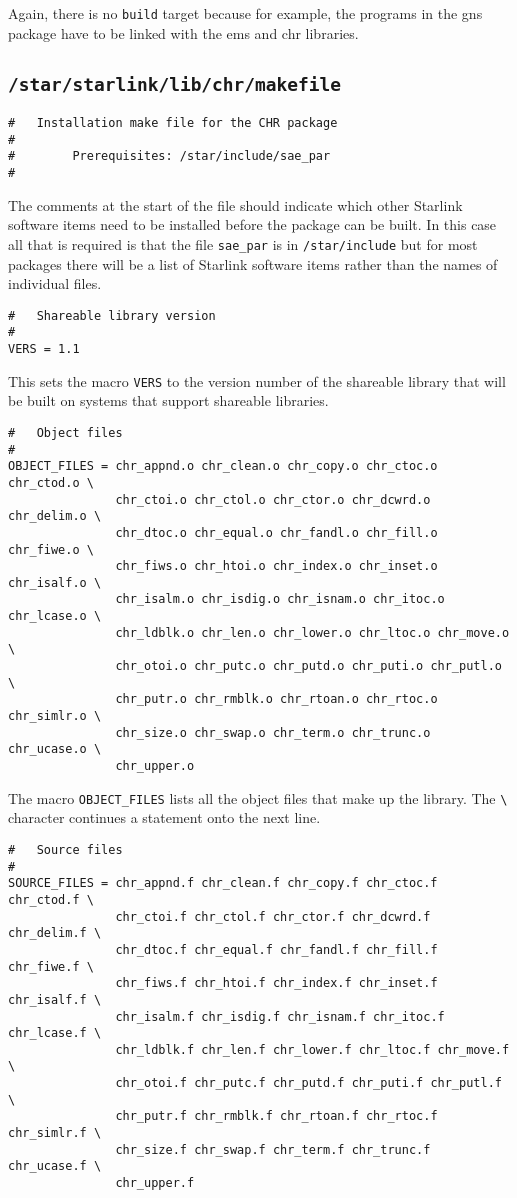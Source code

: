 Again, there is no {\tt build} target because for example, the programs in 
the gns package have to be linked with the ems and chr libraries.
\subsection{\tt /star/starlink/lib/chr/makefile}
\begin{verbatim}
#   Installation make file for the CHR package
#
#        Prerequisites: /star/include/sae_par
#
\end{verbatim}
The comments at the start of the file
should indicate which other Starlink software items need to be installed before
the package can be built. In this case all that is required is that the file
{\tt sae\_par} is in {\tt /star/include} but for most packages there will be a
list of Starlink software items rather than the names of individual files.
\begin{verbatim}
#   Shareable library version
#
VERS = 1.1
\end{verbatim}
This sets the macro {\tt VERS} to the version number of the shareable
library that will be built on systems that support shareable libraries.
\begin{verbatim}
#   Object files 
#
OBJECT_FILES = chr_appnd.o chr_clean.o chr_copy.o chr_ctoc.o chr_ctod.o \
               chr_ctoi.o chr_ctol.o chr_ctor.o chr_dcwrd.o chr_delim.o \
               chr_dtoc.o chr_equal.o chr_fandl.o chr_fill.o chr_fiwe.o \
               chr_fiws.o chr_htoi.o chr_index.o chr_inset.o chr_isalf.o \
               chr_isalm.o chr_isdig.o chr_isnam.o chr_itoc.o chr_lcase.o \
               chr_ldblk.o chr_len.o chr_lower.o chr_ltoc.o chr_move.o \
               chr_otoi.o chr_putc.o chr_putd.o chr_puti.o chr_putl.o \
               chr_putr.o chr_rmblk.o chr_rtoan.o chr_rtoc.o chr_simlr.o \
               chr_size.o chr_swap.o chr_term.o chr_trunc.o chr_ucase.o \
               chr_upper.o
\end{verbatim}
The macro {\tt OBJECT\_FILES} lists all the object files that make up the
library. The \verb+\+ character continues a statement onto the next line.
\begin{verbatim}
#   Source files
#
SOURCE_FILES = chr_appnd.f chr_clean.f chr_copy.f chr_ctoc.f chr_ctod.f \
               chr_ctoi.f chr_ctol.f chr_ctor.f chr_dcwrd.f chr_delim.f \
               chr_dtoc.f chr_equal.f chr_fandl.f chr_fill.f chr_fiwe.f \
               chr_fiws.f chr_htoi.f chr_index.f chr_inset.f chr_isalf.f \
               chr_isalm.f chr_isdig.f chr_isnam.f chr_itoc.f chr_lcase.f \
               chr_ldblk.f chr_len.f chr_lower.f chr_ltoc.f chr_move.f \
               chr_otoi.f chr_putc.f chr_putd.f chr_puti.f chr_putl.f \
               chr_putr.f chr_rmblk.f chr_rtoan.f chr_rtoc.f chr_simlr.f \
               chr_size.f chr_swap.f chr_term.f chr_trunc.f chr_ucase.f \
               chr_upper.f
\end{verbatim}
